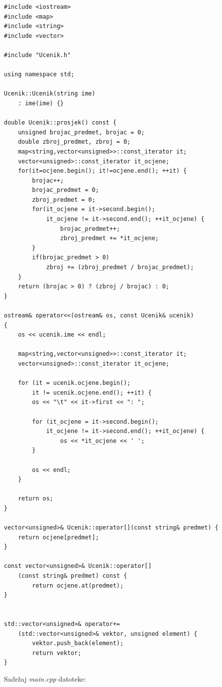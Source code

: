 \begin{verbatim}
#include <iostream>
#include <map>
#include <string>
#include <vector>

#include "Ucenik.h"

using namespace std;

Ucenik::Ucenik(string ime)
    : ime(ime) {}

double Ucenik::prosjek() const {
    unsigned brojac_predmet, brojac = 0;
    double zbroj_predmet, zbroj = 0;
    map<string,vector<unsigned>>::const_iterator it;
    vector<unsigned>::const_iterator it_ocjene;
    for(it=ocjene.begin(); it!=ocjene.end(); ++it) {
        brojac++;
        brojac_predmet = 0;
        zbroj_predmet = 0;
        for(it_ocjene = it->second.begin();
            it_ocjene != it->second.end(); ++it_ocjene) {
                brojac_predmet++;
                zbroj_predmet += *it_ocjene;
        }
        if(brojac_predmet > 0)
            zbroj += (zbroj_predmet / brojac_predmet);
    }
    return (brojac > 0) ? (zbroj / brojac) : 0;
}

ostream& operator<<(ostream& os, const Ucenik& ucenik)
{
    os << ucenik.ime << endl;
    
    map<string,vector<unsigned>>::const_iterator it;
    vector<unsigned>::const_iterator it_ocjene;

    for (it = ucenik.ocjene.begin(); 
        it != ucenik.ocjene.end(); ++it) {
        os << "\t" << it->first << ": ";

        for (it_ocjene = it->second.begin();
            it_ocjene != it->second.end(); ++it_ocjene) {
                os << *it_ocjene << ' ';
        }
        
        os << endl;
    }

    return os;
}

vector<unsigned>& Ucenik::operator[](const string& predmet) {
    return ocjene[predmet];
}

const vector<unsigned>& Ucenik::operator[]
    (const string& predmet) const {
        return ocjene.at(predmet);
}


std::vector<unsigned>& operator+=
    (std::vector<unsigned>& vektor, unsigned element) {
        vektor.push_back(element);
        return vektor;
}
\end{verbatim}

Sadržaj \textit{main.cpp} datoteke:

